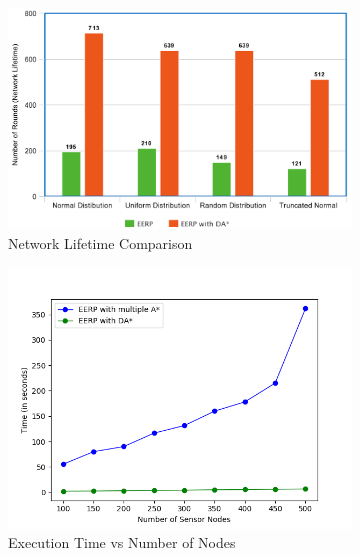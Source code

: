 \documentclass[a4paper]{article}
\begin{document}
\begin{figure}[H]
    \centering
    \begin{subfigure}[b]{0.47\textwidth}
         \centering
         \includegraphics[width=\textwidth]{img/chart.png}
         \caption{Network Lifetime Comparison }
         \label{fig:wsn_life}
    \end{subfigure}
    \hfill
    \begin{subfigure}[b]{0.47\textwidth}
        \centering
         \includegraphics[width=\textwidth]{img/eerp.png}
         \caption{Execution Time vs Number of Nodes}
         \label{fig:wsn_runtime}
    \end{subfigure}
    \caption{}
    \label{fig:wsn_plots}
\end{figure}
\end{document}
